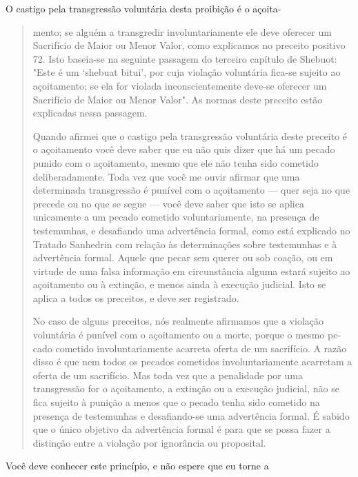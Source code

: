 O castigo pela transgressão voluntária desta proibição é o açoita-

\begin{quote}
mento; se alguém a transgredir involuntariamente ele deve oferecer um
Sacrifí­cio de Maior ou Menor Valor, como explicamos no preceito
positivo 72. Isto baseia-se na seguinte passagem do terceiro capítulo de
Shebuot: "Este é um `she­buat bitui', por cuja violação voluntária
fica-se sujeito ao açoitamento; se ela for violada inconscientemente
deve-se oferecer um Sacrifício de Maior ou Me­nor Valor". As normas
deste preceito estão explicadas nessa passagem.

Quando afirmei que o castigo pela transgressão voluntária deste
pre­ceito é o açoitamento você deve saber que eu não quis dizer que há
um pecado punido com o açoitamento, mesmo que ele não tenha sido
cometido delibera­damente. Toda vez que você me ouvir afirmar que uma
determinada transgres­são é punível com o açoitamento --- quer seja no
que precede ou no que se segue --- você deve saber que isto se aplica
unicamente a um pecado cometido voluntariamente, na presença de
testemunhas, e desafiando uma advertência formal, como está explicado no
Tratado Sanhedrin com relação às determina­ções sobre testemunhas e à
advertência formal. Aquele que pecar sem querer ou sob coação, ou em
virtude de uma falsa informação em circunstância algu­ma estará sujeito
ao açoitamento ou à extinção, e menos ainda à execução judi­cial. Isto
se aplica a todos os preceitos, e deve ser registrado.

No caso de alguns preceitos, nós realmente afirmamos que a viola­ção
voluntária é punível com o açoitamento ou a morte, porque o mesmo
pe­cado cometido involuntariamente acarreta oferta de um sacrifício. A
razão dis­so é que nem todos os pecados cometidos involuntariamente
acarretam a ofer­ta de um sacrifício. Mas toda vez que a penalidade por
uma transgressão for o açoitamento, a extinção ou a execução judicial,
não se fica sujeito à punição a menos que o pecado tenha sido cometido
na presença de testemunhas e desafiando-se uma advertência formal. É
sabido que o único objetivo da adver­tência formal é para que se possa
fazer a distinção entre a violação por ignorân­cia ou proposital.
\end{quote}

Você deve conhecer este princípio, e não espere que eu torne a

